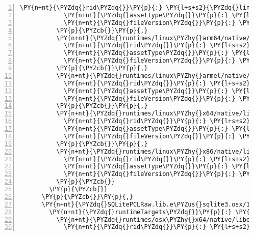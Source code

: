 \begin{Verbatim}[commandchars=\\\{\},numbers=left,firstnumber=1,stepnumber=1,numberblanklines=0]
            \PY{n+nt}{\PYZdq{}rid\PYZdq{}}\PY{p}{:} \PY{l+s+s2}{\PYZdq{}linux\PYZhy{}arm\PYZdq{}}\PY{p}{,}
            \PY{n+nt}{\PYZdq{}assetType\PYZdq{}}\PY{p}{:} \PY{l+s+s2}{\PYZdq{}native\PYZdq{}}\PY{p}{,}
            \PY{n+nt}{\PYZdq{}fileVersion\PYZdq{}}\PY{p}{:} \PY{l+s+s2}{\PYZdq{}0.0.0.0\PYZdq{}}
          \PY{p}{\PYZcb{}}\PY{p}{,}
          \PY{n+nt}{\PYZdq{}runtimes/linux\PYZhy{}arm64/native/libe\PYZus{}sqlite3.so\PYZdq{}}\PY{p}{:} \PY{p}{\PYZob{}}
            \PY{n+nt}{\PYZdq{}rid\PYZdq{}}\PY{p}{:} \PY{l+s+s2}{\PYZdq{}linux\PYZhy{}arm64\PYZdq{}}\PY{p}{,}
            \PY{n+nt}{\PYZdq{}assetType\PYZdq{}}\PY{p}{:} \PY{l+s+s2}{\PYZdq{}native\PYZdq{}}\PY{p}{,}
            \PY{n+nt}{\PYZdq{}fileVersion\PYZdq{}}\PY{p}{:} \PY{l+s+s2}{\PYZdq{}0.0.0.0\PYZdq{}}
          \PY{p}{\PYZcb{}}\PY{p}{,}
          \PY{n+nt}{\PYZdq{}runtimes/linux\PYZhy{}armel/native/libe\PYZus{}sqlite3.so\PYZdq{}}\PY{p}{:} \PY{p}{\PYZob{}}
            \PY{n+nt}{\PYZdq{}rid\PYZdq{}}\PY{p}{:} \PY{l+s+s2}{\PYZdq{}linux\PYZhy{}armel\PYZdq{}}\PY{p}{,}
            \PY{n+nt}{\PYZdq{}assetType\PYZdq{}}\PY{p}{:} \PY{l+s+s2}{\PYZdq{}native\PYZdq{}}\PY{p}{,}
            \PY{n+nt}{\PYZdq{}fileVersion\PYZdq{}}\PY{p}{:} \PY{l+s+s2}{\PYZdq{}0.0.0.0\PYZdq{}}
          \PY{p}{\PYZcb{}}\PY{p}{,}
          \PY{n+nt}{\PYZdq{}runtimes/linux\PYZhy{}x64/native/libe\PYZus{}sqlite3.so\PYZdq{}}\PY{p}{:} \PY{p}{\PYZob{}}
            \PY{n+nt}{\PYZdq{}rid\PYZdq{}}\PY{p}{:} \PY{l+s+s2}{\PYZdq{}linux\PYZhy{}x64\PYZdq{}}\PY{p}{,}
            \PY{n+nt}{\PYZdq{}assetType\PYZdq{}}\PY{p}{:} \PY{l+s+s2}{\PYZdq{}native\PYZdq{}}\PY{p}{,}
            \PY{n+nt}{\PYZdq{}fileVersion\PYZdq{}}\PY{p}{:} \PY{l+s+s2}{\PYZdq{}0.0.0.0\PYZdq{}}
          \PY{p}{\PYZcb{}}\PY{p}{,}
          \PY{n+nt}{\PYZdq{}runtimes/linux\PYZhy{}x86/native/libe\PYZus{}sqlite3.so\PYZdq{}}\PY{p}{:} \PY{p}{\PYZob{}}
            \PY{n+nt}{\PYZdq{}rid\PYZdq{}}\PY{p}{:} \PY{l+s+s2}{\PYZdq{}linux\PYZhy{}x86\PYZdq{}}\PY{p}{,}
            \PY{n+nt}{\PYZdq{}assetType\PYZdq{}}\PY{p}{:} \PY{l+s+s2}{\PYZdq{}native\PYZdq{}}\PY{p}{,}
            \PY{n+nt}{\PYZdq{}fileVersion\PYZdq{}}\PY{p}{:} \PY{l+s+s2}{\PYZdq{}0.0.0.0\PYZdq{}}
          \PY{p}{\PYZcb{}}
        \PY{p}{\PYZcb{}}
      \PY{p}{\PYZcb{}}\PY{p}{,}
      \PY{n+nt}{\PYZdq{}SQLitePCLRaw.lib.e\PYZus{}sqlite3.osx/1.1.10\PYZdq{}}\PY{p}{:} \PY{p}{\PYZob{}}
        \PY{n+nt}{\PYZdq{}runtimeTargets\PYZdq{}}\PY{p}{:} \PY{p}{\PYZob{}}
          \PY{n+nt}{\PYZdq{}runtimes/osx\PYZhy{}x64/native/libe\PYZus{}sqlite3.dylib\PYZdq{}}\PY{p}{:} \PY{p}{\PYZob{}}
            \PY{n+nt}{\PYZdq{}rid\PYZdq{}}\PY{p}{:} \PY{l+s+s2}{\PYZdq{}osx\PYZhy{}x64\PYZdq{}}\PY{p}{,}

\end{Verbatim}

